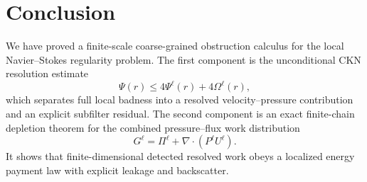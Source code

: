 \documentclass[11pt]{article}
\numberwithin{equation}{section}
\begin{document}
\section{Conclusion}\label{sec:conclusion}

We have proved a finite-scale coarse-grained obstruction calculus for the local Navier--Stokes regularity problem.  The first component is the unconditional CKN resolution estimate
\[
\Psi(r)\le4\Psi^\ell(r)+4\Omega^\ell(r),
\]
which separates full local badness into a resolved velocity--pressure contribution and an explicit subfilter residual.  The second component is an exact finite-chain depletion theorem for the combined pressure--flux work distribution
\[
G^\ell=\Pi^\ell+\nabla\cdot(P^\ell U^\ell).
\]
It shows that finite-dimensional detected resolved work obeys a localized energy payment law with explicit leakage and backscatter.
\end{document}
